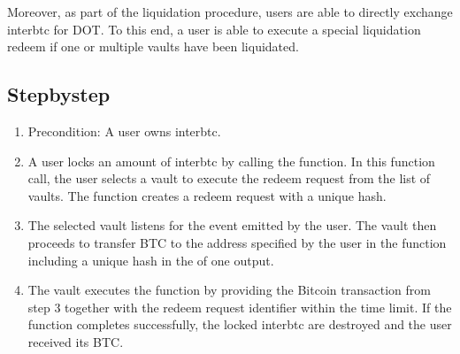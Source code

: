 \documentclass[a4paper,10pt,english]{sphinxmanual}
\begin{document}
Moreover, as part of the liquidation procedure, users are able to directly exchange interbtc for DOT. To this end, a user is able to execute a special liquidation redeem if one or multiple vaults have been liquidated.


\subsection{Step\sphinxhyphen{}by\sphinxhyphen{}step}
\label{\detokenize{spec/redeem:step-by-step}}\begin{enumerate}
%
\item {} 
Precondition: A user owns interbtc.

\item {} 
A user locks an amount of interbtc by calling the {\hyperref[\detokenize{spec/redeem:requestredeem}]{}} function. In this function call, the user selects a vault to execute the redeem request from the list of vaults. The function creates a redeem request with a unique hash.

\item {} 
The selected vault listens for the  event emitted by the user. The vault then proceeds to transfer BTC to the address specified by the user in the {\hyperref[\detokenize{spec/redeem:requestredeem}]{}} function including a unique hash in the  of one output.

\item {} 
The vault executes the {\hyperref[\detokenize{spec/redeem:executeredeem}]{}} function by providing the Bitcoin transaction from step 3 together with the redeem request identifier within the time limit. If the function completes successfully, the locked interbtc are destroyed and the user received its BTC.


\end{enumerate}
\end{document}
